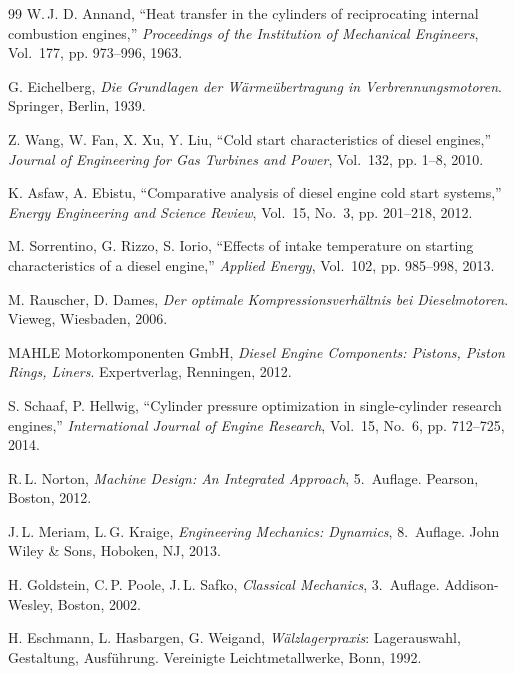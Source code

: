 ﻿\documentclass[a4paper,12pt]{article}
\begin{document}
\begin{thebibliography}{99}
	W.\,J. D. Annand,
	``Heat transfer in the cylinders of reciprocating internal combustion engines,''
	\textit{Proceedings of the Institution of Mechanical Engineers}, Vol.~177, pp. 973--996, 1963.
	
	G. Eichelberg,
	\textit{Die Grundlagen der W{\"a}rme{\"u}bertragung in Verbrennungsmotoren}.
	Springer, Berlin, 1939.
	
	Z. Wang, W. Fan, X. Xu, Y. Liu,
	``Cold start characteristics of diesel engines,''
	\textit{Journal of Engineering for Gas Turbines and Power}, Vol.~132, pp. 1--8, 2010.
	
	K. Asfaw, A. Ebistu,
	``Comparative analysis of diesel engine cold start systems,''
	\textit{Energy Engineering and Science Review}, Vol.~15, No.~3, pp. 201--218, 2012.
	
	M. Sorrentino, G. Rizzo, S. Iorio,
	``Effects of intake temperature on starting characteristics of a diesel engine,''
	\textit{Applied Energy}, Vol.~102, pp. 985--998, 2013.
	
	M. Rauscher, D. Dames,
	\textit{Der optimale Kompressionsverhältnis bei Dieselmotoren}.
	Vieweg, Wiesbaden, 2006.
	
	MAHLE Motorkomponenten GmbH,
	\textit{Diesel Engine Components: Pistons, Piston Rings, Liners}.
	Expertverlag, Renningen, 2012.
	
	S. Schaaf, P. Hellwig,
	``Cylinder pressure optimization in single-cylinder research engines,''
	\textit{International Journal of Engine Research}, Vol.~15, No.~6, pp. 712--725, 2014.
	
	R.\,L. Norton,
	\textit{Machine Design: An Integrated Approach}, 5.~Auflage.
	Pearson, Boston, 2012.
	
	J.\,L. Meriam, L.\,G. Kraige,
	\textit{Engineering Mechanics: Dynamics}, 8.~Auflage.
	John Wiley \& Sons, Hoboken, NJ, 2013.
	
	H. Goldstein, C.\,P. Poole, J.\,L. Safko,
	\textit{Classical Mechanics}, 3.~Auflage.
	Addison-Wesley, Boston, 2002.
	
	H. Eschmann, L. Hasbargen, G. Weigand,
	\textit{Wälzlagerpraxis}: Lagerauswahl, Gestaltung, Ausführung.
	Vereinigte Leichtmetallwerke, Bonn, 1992.
	

\end{thebibliography}
\end{document}
